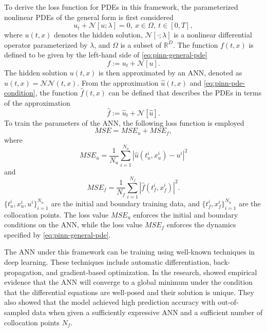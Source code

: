 To derive the loss function for \glspl{PDE} in this framework, the parameterized nonlinear \glspl{PDE} of the general form is first considered \cite{raissiPhysicsinformedNeuralNetworks2019}
\begin{equation}
    u_t + \mathcal{N}[u; \lambda] = 0,\ x \in \Omega,\ t \in [0, T],
    \label{eq:pinn-general-pde}
\end{equation}
where $u(t, x)$ denotes the hidden solution, $\mathcal{N}[\cdot; \lambda]$ is a nonlinear differential operator parameterized by $\lambda$, and $\Omega$ is a subset of $\mathbb{R}^D$.
The function $f(t, x)$ is defined to be given by the left-hand side of \autoref{eq:pinn-general-pde}
\begin{equation}
    f := u_t + \mathcal{N}[u].
    \label{eq:pinn-pde-condition}
\end{equation}
The hidden solution $u(t, x)$ is then approximated by an \gls{ANN}, denoted as $\hat{u}(t, x) = \mathcal{NN}(t, x)$.
From the approximation $\hat{u}(t, x)$ and \autoref{eq:pinn-pde-condition}, the function $\hat{f}(t, x)$ can be defined that describes the \glspl{PDE} in terms of the approximation
\begin{equation*}
    \hat{f} := \hat{u}_t + \mathcal{N}[\hat{u}].
\end{equation*}
To train the parameters of the \gls{ANN}, the following loss function is employed \cite{raissiPhysicsinformedNeuralNetworks2019}
\begin{equation*}
    MSE = MSE_u + MSE_f,
\end{equation*}
where
\begin{equation*}
    MSE_u = \frac{1}{N_u} \sum_{i=1}^{N_u} |\hat{u}(t_u^i, x_u^i) - u^i|^2
\end{equation*}
and
\begin{equation*}
    MSE_f = \frac{1}{N_f} \sum_{i=1}^{N_f} |\hat{f}(t_f^i, x_f^i)|^2.
\end{equation*}
$\{t_u^i, x_u^i, u^i\}_{i=1}^{N_u}$ are the initial and boundary training data, and $\{t_f^i, x_f^i\}_{i=1}^{N_u}$ are the collocation points.
The loss value $MSE_u$ enforces the initial and boundary conditions on the \gls{ANN}, while the loss value $MSE_f$ enforces the dynamics specified by \autoref{eq:pinn-general-pde}.

The \gls{ANN} under this framework can be training using well-known techniques in deep learning.
These techniques include automatic differentiation, back-propagation, and gradient-based optimization.
In the research, \citeauthor{raissiPhysicsinformedNeuralNetworks2019} \cite{raissiPhysicsinformedNeuralNetworks2019} showed empirical evidence that the \gls{ANN} will converge to a global minimum under the condition that the differential equations are well-posed and their solution is unique.
They also showed that the model achieved high prediction accuracy with out-of-sampled data when given a sufficiently expressive \gls{ANN} and a sufficient number of collocation points $N_f$.